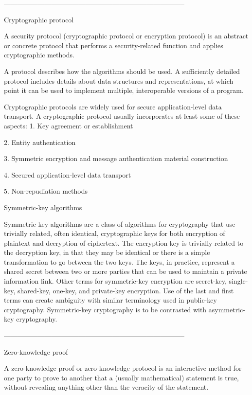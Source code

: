 --------------------------------------------------------------------------------


Cryptographic protocol

A security protocol (cryptographic protocol or encryption protocol) is an abstract or concrete protocol that performs a security-related function and applies cryptographic methods.

A protocol describes how the algorithms should be used. A sufficiently detailed protocol includes details about data structures and representations, at which point it can be used to implement multiple, interoperable versions of a program.

Cryptographic protocols are widely used for secure application-level data transport. A cryptographic protocol usually incorporates at least some of these aspects:
1.
Key agreement or establishment

2.
Entity authentication

3.
Symmetric encryption and message authentication material construction

4.
Secured application-level data transport

5.
Non-repudiation methods



Symmetric-key algorithms

Symmetric-key algorithms are a class of algorithms for cryptography that use trivially related, often identical, cryptographic keys for both encryption of plaintext and decryption of ciphertext. The encryption key is trivially related to the decryption key, in that they may be identical or there is a simple transformation to go between the two keys. The keys, in practice, represent a shared secret between two or more parties that can be used to maintain a private information link. Other terms for symmetric-key encryption are secret-key, single-key, shared-key, one-key, and private-key encryption. Use of the last and first terms can create ambiguity with similar terminology used in public-key cryptography. Symmetric-key cryptography is to be contrasted with asymmetric-key cryptography.



--------------------------------------------------------------------------------


Zero-knowledge proof

A zero-knowledge proof or zero-knowledge protocol is an interactive method for one party to prove to another that a (usually mathematical) statement is true, without revealing anything other than the veracity of the statement.



